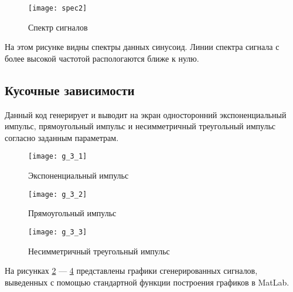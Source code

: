 \begin{figure}[H]
	\begin{center}
		\texttt{[image: spec2]}
		\caption{Спектр сигналов} 
		\label{pic:spec2} %
	\end{center}
\end{figure}
На этом рисунке видны спектры данных синусоид. Линии спектра сигнала с более высокой частотой распологаются ближе к нулю.

\subsection{Кусочные зависимости}


\parindent=1cm
Данный код генерирует и выводит на экран односторонний экспоненциальный импульс, прямоугольный импульс и несимметричный треугольный импульс согласно заданным параметрам.

\begin{figure}[H]
	\begin{center}
		\texttt{[image: g\_3\_1]}
		\caption{Экспоненциальный импульс} 
		\label{pic:g_3_1} %
	\end{center}
\end{figure}
\begin{figure}[H]
	\begin{center}
		\texttt{[image: g\_3\_2]}
		\caption{Прямоугольный импульс} 
		\label{pic:g_3_2} %
	\end{center}
\end{figure}
\begin{figure}[H]
	\begin{center}
		\texttt{[image: g\_3\_3]}
		\caption{Несимметричный треугольный импульс} 
		\label{pic:g_3_3} %
	\end{center}
\end{figure}
На рисунках  \ref{pic:g_3_1} — \ref{pic:g_3_3} представлены графики сгенерированных сигналов, выведенных с помощью стандартной функции построения графиков в MatLab.

